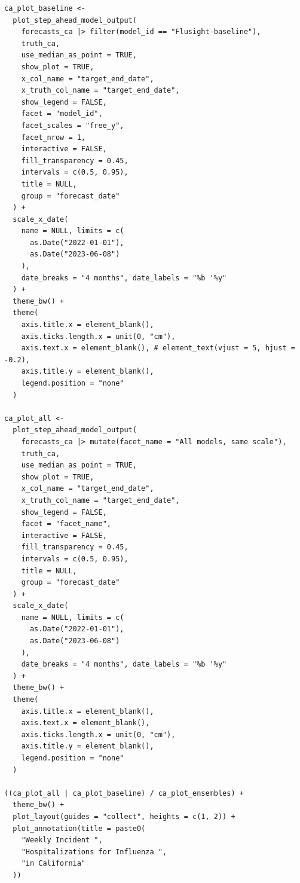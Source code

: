 \documentclass[
  article,
  shortnames,
  notitle]{jss}
\begin{document}
\begin{verbatim}
ca_plot_baseline <-
  plot_step_ahead_model_output(
    forecasts_ca |> filter(model_id == "Flusight-baseline"),
    truth_ca,
    use_median_as_point = TRUE,
    show_plot = TRUE,
    x_col_name = "target_end_date",
    x_truth_col_name = "target_end_date",
    show_legend = FALSE,
    facet = "model_id",
    facet_scales = "free_y",
    facet_nrow = 1,
    interactive = FALSE,
    fill_transparency = 0.45,
    intervals = c(0.5, 0.95),
    title = NULL,
    group = "forecast_date"
  ) +
  scale_x_date(
    name = NULL, limits = c(
      as.Date("2022-01-01"),
      as.Date("2023-06-08")
    ),
    date_breaks = "4 months", date_labels = "%b '%y"
  ) +
  theme_bw() +
  theme(
    axis.title.x = element_blank(),
    axis.ticks.length.x = unit(0, "cm"),
    axis.text.x = element_blank(), # element_text(vjust = 5, hjust = -0.2),
    axis.title.y = element_blank(),
    legend.position = "none"
  )

ca_plot_all <-
  plot_step_ahead_model_output(
    forecasts_ca |> mutate(facet_name = "All models, same scale"),
    truth_ca,
    use_median_as_point = TRUE,
    show_plot = TRUE,
    x_col_name = "target_end_date",
    x_truth_col_name = "target_end_date",
    show_legend = FALSE,
    facet = "facet_name",
    interactive = FALSE,
    fill_transparency = 0.45,
    intervals = c(0.5, 0.95),
    title = NULL,
    group = "forecast_date"
  ) +
  scale_x_date(
    name = NULL, limits = c(
      as.Date("2022-01-01"),
      as.Date("2023-06-08")
    ),
    date_breaks = "4 months", date_labels = "%b '%y"
  ) +
  theme_bw() +
  theme(
    axis.title.x = element_blank(),
    axis.text.x = element_blank(),
    axis.ticks.length.x = unit(0, "cm"),
    axis.title.y = element_blank(),
    legend.position = "none"
  )

((ca_plot_all | ca_plot_baseline) / ca_plot_ensembles) +
  theme_bw() +
  plot_layout(guides = "collect", heights = c(1, 2)) +
  plot_annotation(title = paste0(
    "Weekly Incident ",
    "Hospitalizations for Influenza ",
    "in California"
  ))
\end{verbatim}
\end{document}
